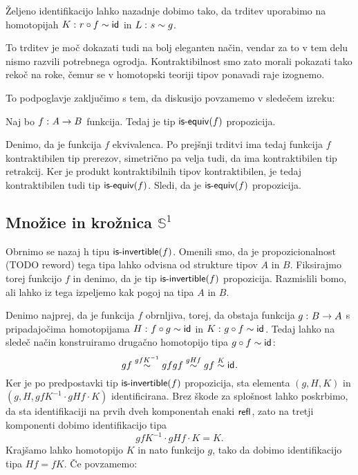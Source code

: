 \begin{dokaz}
\begin{enumerate}
Željeno identifikacijo lahko nazadnje dobimo tako, da trditev uporabimo na homotopijah \(K \,\colon r \circ f \sim \textnormal{\textsf{id}}_{}\) in \(L \,\colon s \sim g\).
\end{enumerate}
\end{dokaz}

To trditev je moč dokazati tudi na bolj eleganten način, vendar za to v tem delu nismo razvili potrebnega ogrodja. Kontraktibilnost smo zato morali pokazati tako rekoč na roke, čemur se v homotopski teoriji tipov ponavadi raje izognemo.

To podpoglavje zaključimo s tem, da diskusijo povzamemo v sledečem izreku:

\begin{izrek}
  \label{is-equiv-prop}
  Naj bo \(f \,\colon A \to B\) funkcija. Tedaj je tip \(\textnormal{\textsf{is-equiv}}(f)\) propozicija.
\end{izrek}

\begin{dokaz}
  Denimo, da je funkcija \(f\) ekvivalenca. Po prejšnji trditvi ima tedaj funkcija \(f\) kontraktibilen tip prerezov, simetrično pa velja tudi, da ima kontraktibilen tip retrakcij. Ker je produkt kontraktibilnih tipov kontraktibilen, je tedaj kontraktibilen tudi tip \(\textnormal{\textsf{is-equiv}}(f)\). Sledi, da je \(\textnormal{\textsf{is-equiv}}(f)\) propozicija.
\end{dokaz}

\subsection{Množice in krožnica \(\mathbb{S}^{1}\)}

Obrnimo se nazaj h tipu \(\textnormal{\textsf{is-invertible}}(f)\). Omenili smo, da je propozicionalnost (TODO reword) tega tipa lahko odvisna od strukture tipov \(A\) in \(B\). Fiksirajmo torej funkcijo \(f\) in denimo, da je tip \(\textnormal{\textsf{is-invertible}}(f)\) propozicija. Razmislili bomo, ali lahko iz tega izpeljemo kak pogoj na tipa \(A\) in \(B\).

Denimo najprej, da je funkcija \(f\) obrnljiva, torej, da obstaja funkcija \(g \,\colon B \to A\) s pripadajočima homotopijama \(H \,\colon f \circ g \sim \textnormal{\textsf{id}}_{}\) in \(K \,\colon g \circ f \sim \textnormal{\textsf{id}}_{}\). Tedaj lahko na sledeč način konstruiramo drugačno homotopijo tipa \(g \circ f \sim \textnormal{\textsf{id}}_{}\):
\[gf \overset{gfK^{-1}}{\sim} gfgf \overset{gHf}{\sim} gf \overset{K}{\sim} \textnormal{\textsf{id}}_{}.\]
Ker je po predpostavki tip \(\textnormal{\textsf{is-invertible}}(f)\) propozicija, sta elementa \((g, H, K)\)
in \((g, H, gfK^{-1} \cdot gHf \cdot K)\) identificirana. Brez škode za splošnost lahko poskrbimo, da sta identifikaciji na prvih dveh komponentah enaki \(\textnormal{\textsf{refl}}_{}\), zato na tretji komponenti dobimo identifikacijo tipa \[gfK^{-1} \cdot gHf \cdot K = K.\]
Krajšamo lahko homotopijo \(K\) in nato funkcijo \(g\), tako da dobimo identifikacijo tipa \(Hf = fK\). Če povzamemo:

